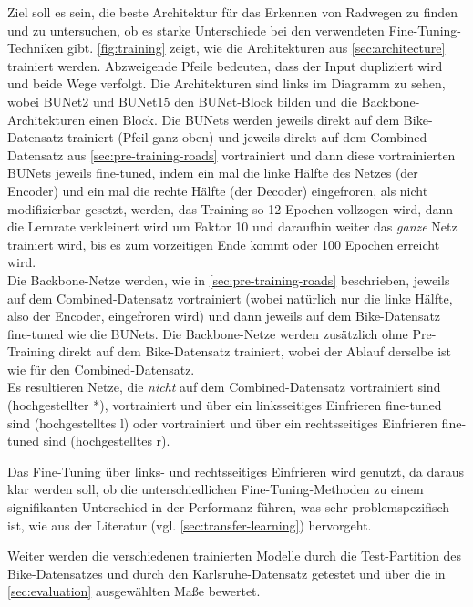 Ziel soll es sein, die beste Architektur für das Erkennen von Radwegen zu finden und zu untersuchen,
ob es starke Unterschiede bei den verwendeten Fine-Tuning-Techniken gibt. 
\autoref{fig:training} zeigt, wie die Architekturen aus \autoref{sec:architecture} trainiert werden. 
Abzweigende Pfeile bedeuten, dass der Input dupliziert wird und beide Wege verfolgt. 
Die Architekturen sind links im Diagramm zu sehen, wobei \ac{BUNet2} und \ac{BUNet15} den \ac{BUNet}-Block 
bilden und die Backbone-Architekturen einen Block. Die \acp{BUNet} werden jeweils direkt auf 
dem Bike-Datensatz trainiert (Pfeil ganz oben) und jeweils direkt auf dem Combined-Datensatz aus \autoref{sec:pre-training-roads}
vortrainiert und dann diese vortrainierten \acp{BUNet} jeweils fine-tuned, indem ein mal die linke Hälfte des 
Netzes (der Encoder) und ein mal die rechte Hälfte (der Decoder) eingefroren, als nicht modifizierbar gesetzt, werden,
das Training so 12 Epochen vollzogen wird, dann die Lernrate verkleinert wird um Faktor 10 und daraufhin weiter 
das \textit{ganze} Netz trainiert wird, bis es zum vorzeitigen Ende kommt oder 100 Epochen erreicht wird. \\
Die Backbone-Netze werden, wie in \autoref{sec:pre-training-roads} beschrieben, jeweils auf dem Combined-Datensatz vortrainiert
(wobei natürlich nur die linke Hälfte, also der Encoder, eingefroren wird) und dann jeweils auf dem Bike-Datensatz 
fine-tuned wie die \acp{BUNet}. Die Backbone-Netze werden zusätzlich ohne Pre-Training direkt auf dem Bike-Datensatz 
trainiert, wobei der Ablauf derselbe ist wie für den Combined-Datensatz. \\
Es resultieren Netze, die \textit{nicht} auf dem Combined-Datensatz vortrainiert sind (hochgestellter *), 
vortrainiert und über ein linksseitiges Einfrieren fine-tuned sind (hochgestelltes l) oder vortrainiert und über ein 
rechtsseitiges Einfrieren fine-tuned sind (hochgestelltes r). 

Das Fine-Tuning über links- und rechtsseitiges Einfrieren wird genutzt, da daraus klar werden soll, ob die unterschiedlichen 
Fine-Tuning-Methoden zu einem signifikanten Unterschied in der Performanz führen, was sehr problemspezifisch ist, 
wie aus der Literatur (vgl. \autoref{sec:transfer-learning}) hervorgeht. 

Weiter werden die verschiedenen trainierten Modelle durch die Test-Partition des Bike-Datensatzes und durch den Karlsruhe-Datensatz 
getestet und über die in \autoref{sec:evaluation} ausgewählten Maße bewertet.


